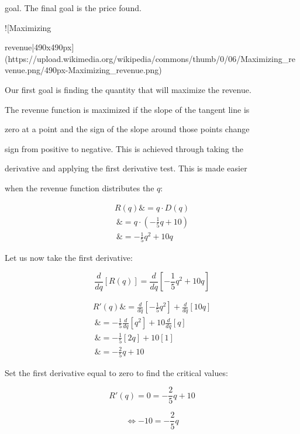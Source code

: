 goal. The final goal is the price found.



![Maximizing

revenue|490x490px](https://upload.wikimedia.org/wikipedia/commons/thumb/0/06/Maximizing\_revenue.png/490px-Maximizing\_revenue.png)



Our first goal is finding the quantity that will maximize the revenue.

The revenue function is maximized if the slope of the tangent line is

zero at a point and the sign of the slope around those points change

sign from positive to negative. This is achieved through taking the

derivative and applying the first derivative test. This is made easier

when the revenue function distributes the $q$:



\begin{align}
 R(q)\&=q\cdot D(q) \\\ \&=q\cdot\left(-\frac{1}{5}q+10\right) \\\ \&=-\frac{1}{5}q^{2}+10q
\end{align}



Let us now take the first derivative:



$$\frac{d}{dq}\left[R(q)\right]=\frac{d}{dq}\left[-\frac{1}{5}q^{2}+10q\right]$$



\begin{align}
 R'(q)\&=\frac{d}{dq}\left[-\frac{1}{5}q^{2}\right]+\frac{d}{dq}\left[10q\right] \\\ \&=-\frac{1}{5}\frac{d}{dq}\left[q^{2}\right]+10\frac{d}{dq}\left[q\right] \\\ \&=-\frac{1}{5}\left[2q\right]+10\left[1\right] \\\ \&=-\frac{2}{5}q+10
\end{align}



Set the first derivative equal to zero to find the critical values:



$$R'(q)=0=-\frac{2}{5}q+10$$



$$\Leftrightarrow-10=-\frac{2}{5}q$$




